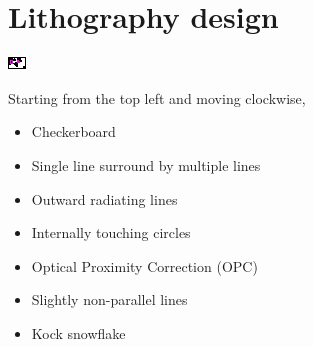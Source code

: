 \section{Lithography design}
\begin{Figure}
    \centering
    \includegraphics[trim=0mm 0.12mm 0.17mm 0mm, clip=true,width=\linewidth]{figures/litho_design.pdf}
    \label{fig:distancea10}
\end{Figure} 

Starting from the top left and moving clockwise,

\begin{itemize}
\item Checkerboard
\item Single line surround by multiple lines
\item Outward radiating lines
\item Internally touching circles
\item Optical Proximity Correction (OPC)
\item Slightly non-parallel lines
\item Kock snowflake
\end{itemize}

